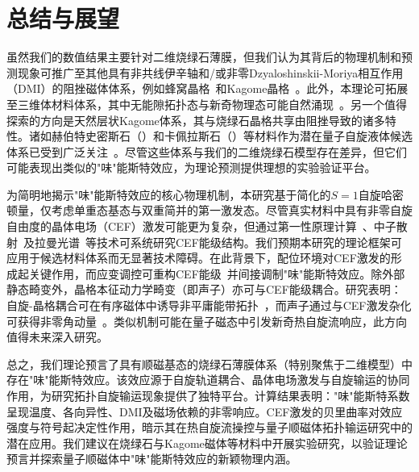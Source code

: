 \chapter{总结与展望}
\label{chap:summary}
    虽然我们的数值结果主要针对二维烧绿石薄膜，但我们认为其背后的物理机制和预测现象可推广至其他具有非共线伊辛轴和/或非零Dzyaloshinskii-Moriya相互作用（DMI）的阻挫磁体体系，例如蜂窝晶格~\cite{ganesh2011quantum,joshi2019Mathbb,liu2020featureless}和Kagome晶格~\cite{ma2024upper}。此外，本理论可拓展至三维体材料体系，其中无能隙拓扑态与新奇物理态可能自然涌现~\cite{li2018competing,li2016weyl,hwang2020topological}。另一个值得探索的方向是天然层状Kagome体系，其与烧绿石晶格共享由阻挫导致的诸多特性。诸如赫伯特史密斯石（）和卡佩拉斯石（）等材料作为潜在量子自旋液体候选体系已受到广泛关注~\cite{norman2016ColloquiumHerbertsmithite}。尽管这些体系与我们的二维烧绿石模型存在差异，但它们可能表现出类似的"味"能斯特效应，为理论预测提供理想的实验验证平台。

    为简明地揭示"味"能斯特效应的核心物理机制，本研究基于简化的$S=1$自旋哈密顿量，仅考虑单重态基态与双重简并的第一激发态。尽管真实材料中具有非零自旋自由度的晶体电场（CEF）激发可能更为复杂，但通过第一性原理计算~\cite{brooks1997density}、中子散射~\cite{frick1986crystal,zhang2014neutron}及拉曼光谱~\cite{schaack2007raman}等技术可系统研究CEF能级结构。我们预期本研究的理论框架可应用于候选材料体系而无显著技术障碍。在此背景下，配位环境对CEF激发的形成起关键作用，而应变调控可重构CEF能级~\cite{jensen1991rare,ishikawa2017reversed,pinho2021impact}并间接调制"味"能斯特效应。除外部静态畸变外，晶格本征动力学畸变（即声子）亦可与CEF能级耦合。研究表明：自旋-晶格耦合可在有序磁体中诱导非平庸能带拓扑~\cite{go2019topological,park2019topological,ma2022antiferromagnetic,ma2024Chiral}，而声子通过与CEF激发杂化可获得非零角动量~\cite{lujan2024spin,chaudhary2024Giant}。类似机制可能在量子磁态中引发新奇热自旋流响应，此方向值得未来深入研究。
    
    总之，我们理论预言了具有顺磁基态的烧绿石薄膜体系（特别聚焦于二维模型）中存在"味"能斯特效应。该效应源于自旋轨道耦合、晶体电场激发与自旋输运的协同作用，为研究拓扑自旋输运现象提供了独特平台。计算结果表明："味"能斯特系数呈现温度、各向异性、DMI及磁场依赖的非零响应。CEF激发的贝里曲率对效应强度与符号起决定性作用，暗示其在热自旋流操控与量子顺磁体拓扑输运研究中的潜在应用。我们建议在烧绿石与Kagome磁体等材料中开展实验研究，以验证理论预言并探索量子顺磁体中"味"能斯特效应的新颖物理内涵。